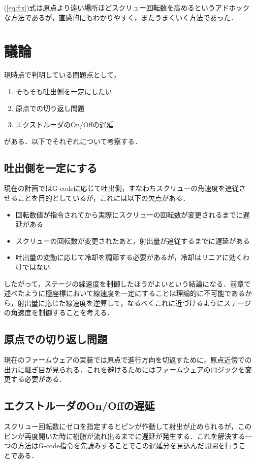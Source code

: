 \documentclass[twocolumn,oneside,a4paper]{article}
\begin{document}
(\ref{eq:fix})式は原点より遠い場所ほどスクリュー回転数を高めるというアドホックな方法であるが，直感的にもわかりやすく，またうまくいく方法であった．

\section{議論}
現時点で判明している問題点として，

\begin{enumerate}
	\item そもそも吐出側を一定にしたい
	\item 原点での切り返し問題
	\item エクストルーダのOn/Offの遅延
\end{enumerate}

がある．以下でそれぞれについて考察する．

\subsection{吐出側を一定にする}
現在の計画ではG-codeに応じて吐出側，すなわちスクリューの角速度を追従させることを目的としているが，これには以下の欠点がある．

\begin{itemize}
    \item 回転数値が指令されてから実際にスクリューの回転数が変更されるまでに遅延がある
    \item スクリューの回転数が変更されたあと，射出量が追従するまでに遅延がある
	\item 吐出量の変動に応じて冷却を調節する必要があるが，冷却はリニアに効くわけではない
\end{itemize}

したがって，ステージの線速度を制御したほうがよいという結論になる．前章で述べたように極座標において線速度を一定にすることは理論的に不可能であるから，射出量に応じた線速度を逆算して，なるべくこれに近づけるようにステージの角速度を制御することを考える．

\subsection{原点での切り返し問題}
現在のファームウェアの実装では原点で進行方向を切返すために，原点近傍での出力に継ぎ目が見られる．これを避けるためにはファームウェアのロジックを変更する必要がある．

\subsection{エクストルーダのOn/Offの遅延}
スクリュー回転数にゼロを指定するとピンが作動して射出が止められるが，このピンが再度開いた時に樹脂が流れ出るまでに遅延が発生する．これを解決する一つの方法はG-code指令を先読みすることでこの遅延分を見込んだ開閉を行うことである．
\end{document}
